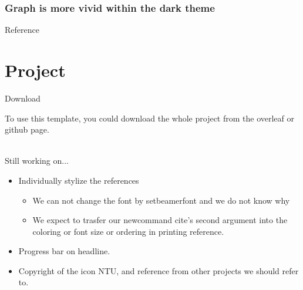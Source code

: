 \documentclass[pdf]{beamer}
\begin{document}
\begin{darkframe}
\frametitle{Graph is more vivid within the dark theme}
\end{darkframe}

\begin{frame}[t, allowframebreaks]{Reference}

\printbibliography
    
    
\end{frame}

\section{Project}


\begin{frame}{Download}

    To use this template, you could download the whole project from
    the overleaf or github page.\\
    \href{https://www.overleaf.com/read/yrcpntvzgsnh}{}~~
    \href{https://github.com/liangchenn/ntu-beamer-template}{\faGithub}
    
\end{frame}


\begin{frame}{Still working on...}

\begin{itemize}
    \item Individually stylize the references
    \begin{itemize}
        \item We can not change the font by setbeamerfont and we do not know why 
        \item We expect to trasfer our newcommand cite's second argument into the coloring or font size or ordering in printing reference. 
    \end{itemize}
    \item Progress bar on headline.
    \item Copyright of the icon NTU, and reference from other projects we should refer to.
    
\end{itemize}
    
\end{frame}
\end{document}
